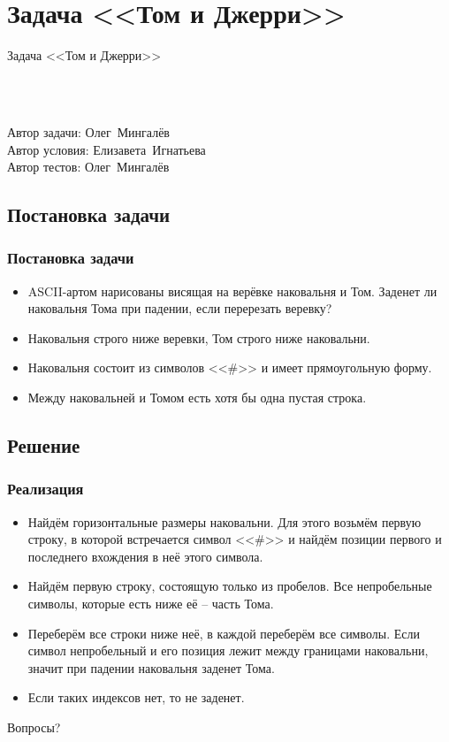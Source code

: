 \section{Задача <<Том и Джерри>>}


\begin{frame}
    \begin{center}
        \Huge Задача <<Том и Джерри>>
    \end{center}
    ~\\~\\
    \begin{center}
        Автор задачи: Олег~Мингалёв\\
        Автор условия: Елизавета~Игнатьева\\
        Автор тестов: Олег~Мингалёв
    \end{center}
\end{frame}

\subsection{Постановка задачи}

\begin{frame}
    \frametitle{Постановка задачи}

    \begin{itemize}
        \item ASCII-артом нарисованы висящая на верёвке наковальня и Том. Заденет ли наковальня Тома при падении, если перерезать веревку?
        \item Наковальня строго ниже веревки, Том строго ниже наковальни.
        \item Наковальня состоит из символов <<\#>> и имеет прямоугольную форму.
        \item Между наковальней и Томом есть хотя бы одна пустая строка.
    \end{itemize}
\end{frame}

\subsection{Решение}

\begin{frame}
    \frametitle{Реализация}

    \begin{itemize}
        \item Найдём горизонтальные размеры наковальни. Для этого возьмём первую строку, в которой встречается символ <<\#>> и найдём позиции первого и последнего вхождения в неё этого символа.
        \item Найдём первую строку, состоящую только из пробелов. Все непробельные символы, которые есть ниже её -- часть Тома.
        \item Переберём все строки ниже неё, в каждой переберём все символы. Если символ непробельный и его позиция лежит между границами наковальни, значит при падении наковальня заденет Тома.
        \item Если таких индексов нет, то не заденет.
    \end{itemize}
\end{frame}

\begin{frame}
    \begin{center}
        \Huge Вопросы?
    \end{center}
\end{frame}

